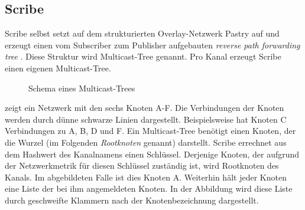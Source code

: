 \subsection{Scribe}
\label{chap:related:scribe}
Scribe \cite{Castro2002Scribe} selbst setzt auf dem strukturierten Overlay-Netzwerk Pastry \cite{Rowstron2001} auf und erzeugt einen vom Subscriber zum Publisher aufgebauten \emph{reverse path forwarding tree} \cite{Dalal1978}. Diese Struktur wird Multicast-Tree genannt. Pro Kanal erzeugt Scribe einen eigenen Multicast-Tree.

\begin{figure}[htbp]
\centering
{}
\caption{Schema eines Multicast-Trees}
\label{fig:multicast_tree}
\end{figure}

 zeigt ein Netzwerk mit den sechs Knoten A-F. Die Verbindungen der Knoten werden durch dünne schwarze Linien dargestellt. Beispielsweise hat Knoten C Verbindungen zu A, B, D und F. Ein Multicast-Tree benötigt einen Knoten, der die Wurzel (im Folgenden \emph{Rootknoten} genannt) darstellt. Scribe errechnet aus dem Hashwert des Kanalnamens einen Schlüssel. Derjenige Knoten, der aufgrund der Netzwerkmetrik für diesen Schlüssel zuständig ist, wird Rootknoten des Kanals. Im abgebildeten Falle ist dies Knoten A. Weiterhin hält jeder Knoten eine Liste der bei ihm angemeldeten Knoten. In der Abbildung wird diese Liste durch geschweifte Klammern nach der Knotenbezeichnung dargestellt.

